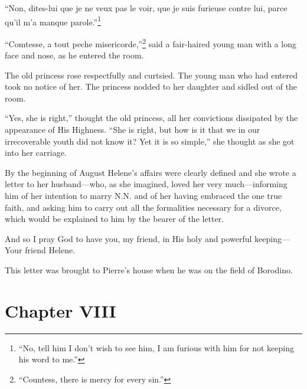 ``Non, dites-lui que je ne veux pas le voir, que je suis furieuse
contre lui, parce qu'il m'a manque parole.''\footnote{``No, tell
him I don't wish to see him, I am furious with him for not
keeping his word to me.''}

``Comtesse, a tout peche misericorde,''\footnote{``Countess,
there is mercy for every sin.''} said a fair-haired young man
with a long face and nose, as he entered the room.

The old princess rose respectfully and curtsied. The young man
who had entered took no notice of her. The princess nodded to her
daughter and sidled out of the room.

``Yes, she is right,'' thought the old princess, all her
convictions dissipated by the appearance of His Highness. ``She
is right, but how is it that we in our irrecoverable youth did
not know it? Yet it is so simple,'' she thought as she got into
her carriage.

By the beginning of August Helene's affairs were clearly defined
and she wrote a letter to her husband---who, as she imagined,
loved her very much---informing him of her intention to marry
N.N. and of her having embraced the one true faith, and asking
him to carry out all the formalities necessary for a divorce,
which would be explained to him by the bearer of the letter.

And so I pray God to have you, my friend, in His holy and
powerful keeping---Your friend Helene.

This letter was brought to Pierre's house when he was on the
field of Borodino.


\chapter*{Chapter VIII} \ifaudio {}
\fi

